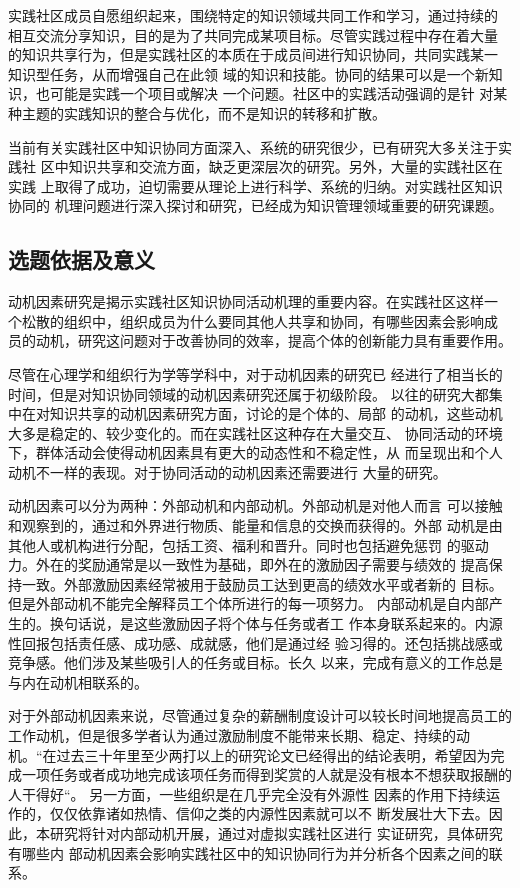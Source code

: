 \documentclass[12pt,a4paper,cs4size]{ctexart}
\begin{document}
实践社区成员自愿组织起来，围绕特定的知识领域共同工作和学习，通过持续的
相互交流分享知识，目的是为了共同完成某项目标。尽管实践过程中存在着大量
的知识共享行为，但是实践社区的本质在于成员间进行知识协同，共同实践某一
知识型任务，从而增强自己在此领
域的知识和技能。协同的结果可以是一个新知识，也可能是实践一个项目或解决
一个问题。社区中的实践活动强调的是针
对某种主题的实践知识的整合与优化，而不是知识的转移和扩散。

当前有关实践社区中知识协同方面深入、系统的研究很少，已有研究大多关注于实践社
区中知识共享和交流方面，缺乏更深层次的研究。另外，大量的实践社区在实践
上取得了成功，迫切需要从理论上进行科学、系统的归纳。对实践社区知识协同的
机理问题进行深入探讨和研究，已经成为知识管理领域重要的研究课题。

\subsection{选题依据及意义}

动机因素研究是揭示实践社区知识协同活动机理的重要内容。在实践社区这样一
个松散的组织中，组织成员为什么要同其他人共享和协同，有哪些因素会影响成
员的动机，研究这问题对于改善协同的效率，提高个体的创新能力具有重要作用。

尽管在心理学和组织行为学等学科中，对于动机因素的研究已
经进行了相当长的时间，但是对知识协同领域的动机因素研究还属于初级阶段。
以往的研究大都集中在对知识共享的动机因素研究方面，讨论的是个体的、局部
的动机，这些动机大多是稳定的、较少变化的。而在实践社区这种存在大量交互、
协同活动的环境下，群体活动会使得动机因素具有更大的动态性和不稳定性，从
而呈现出和个人动机不一样的表现。对于协同活动的动机因素还需要进行
大量的研究。



动机因素可以分为两种：外部动机和内部动机。外部动机是对他人而言
可以接触和观察到的，通过和外界进行物质、能量和信息的交换而获得的。外部
动机是由其他人或机构进行分配，包括工资、福利和晋升。同时也包括避免惩罚
的驱动力。外在的奖励通常是以一致性为基础，即外在的激励因子需要与绩效的
提高保持一致。外部激励因素经常被用于鼓励员工达到更高的绩效水平或者新的
目标。但是外部动机不能完全解释员工个体所进行的每一项努力。
 内部动机是自内部产生的。换句话说，是这些激励因子将个体与任务或者工
 作本身联系起来的。内源性回报包括责任感、成功感、成就感，他们是通过经
 验习得的。还包括挑战感或竞争感。他们涉及某些吸引人的任务或目标。长久
 以来，完成有意义的工作总是与内在动机相联系的\cite{Luthans2001}。

对于外部动机因素来说，尽管通过复杂的薪酬制度设计可以较长时间地提高员工的
工作动机，但是很多学者认为通过激励制度不能带来长期、稳定、持续的动机。“在过去三十年里至少两打以上的研究论文已经得出的结论表明，希望因为完成一项任务或者成功地完成该项任务而得到奖赏的人就是没有根本不想获取报酬的人干得好“\cite{93120316461993}。
另一方面，一些组织是在几乎完全没有外源性
因素的作用下持续运作的，仅仅依靠诸如热情、信仰之类的内源性因素就可以不
断发展壮大下去。因此，本研究将针对内部动机开展，通过对虚拟实践社区进行
实证研究，具体研究有哪些内
部动机因素会影响实践社区中的知识协同行为并分析各个因素之间的联系。
\end{document}
